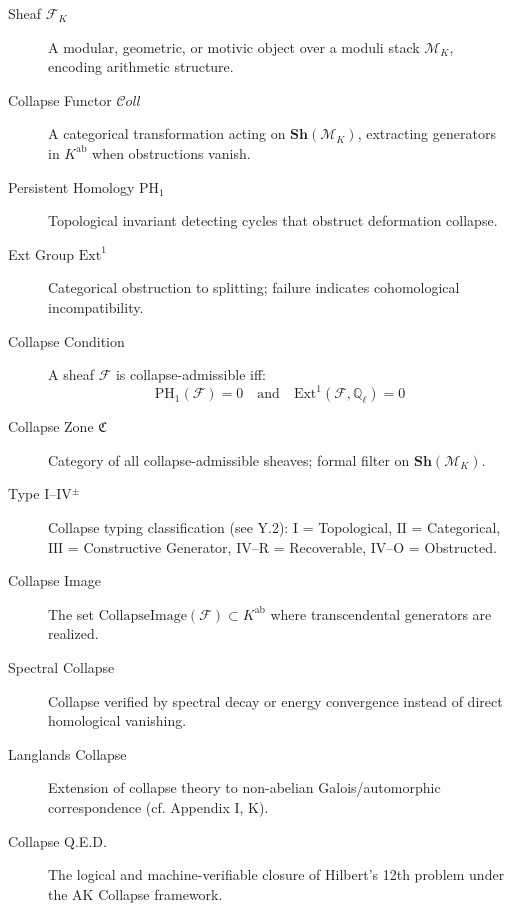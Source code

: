 \documentclass[11pt]{article}
\begin{document}
\begin{description}
  \item[Sheaf \( \mathcal{F}_K \)] A modular, geometric, or motivic object over a moduli stack \( \mathcal{M}_K \), encoding arithmetic structure.

  \item[Collapse Functor \( \mathcal{C}oll \)] A categorical transformation acting on \( \mathbf{Sh}(\mathcal{M}_K) \), extracting generators in \( K^{\mathrm{ab}} \) when obstructions vanish.

  \item[Persistent Homology \( \mathrm{PH}_1 \)] Topological invariant detecting cycles that obstruct deformation collapse.

  \item[Ext Group \( \mathrm{Ext}^1 \)] Categorical obstruction to splitting; failure indicates cohomological incompatibility.

  \item[Collapse Condition] A sheaf \( \mathcal{F} \) is collapse-admissible iff:
  \[
  \mathrm{PH}_1(\mathcal{F}) = 0 \quad \text{and} \quad \mathrm{Ext}^1(\mathcal{F}, \mathbb{Q}_\ell) = 0
  \]

  \item[Collapse Zone \( \mathfrak{C} \)] Category of all collapse-admissible sheaves; formal filter on \( \mathbf{Sh}(\mathcal{M}_K) \).

  \item[Type I–IV\(^{\pm}\)] Collapse typing classification (see Y.2):  
  \( \text{I} \) = Topological,  
  \( \text{II} \) = Categorical,  
  \( \text{III} \) = Constructive Generator,  
  \( \text{IV–R} \) = Recoverable,  
  \( \text{IV–O} \) = Obstructed.

  \item[Collapse Image] The set \( \text{CollapseImage}(\mathcal{F}) \subset K^{\mathrm{ab}} \) where transcendental generators are realized.

  \item[Spectral Collapse] Collapse verified by spectral decay or energy convergence instead of direct homological vanishing.

  \item[Langlands Collapse] Extension of collapse theory to non-abelian Galois/automorphic correspondence (cf. Appendix I, K).

  \item[Collapse Q.E.D.] The logical and machine-verifiable closure of Hilbert’s 12th problem under the AK Collapse framework.
\end{description}
\end{document}
